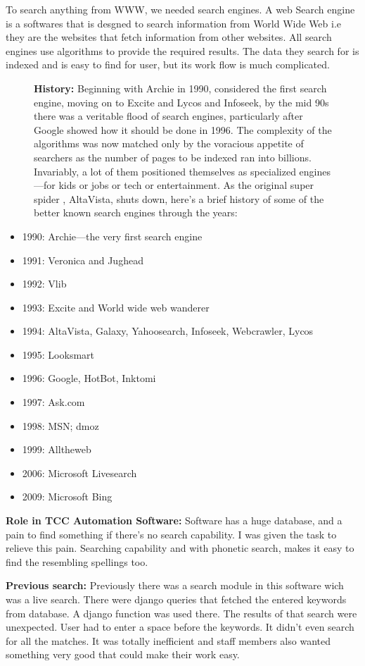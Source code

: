 To search anything from WWW, we
needed search engines. A web Search engine is a softwares  that is desgned 
to search information from World Wide Web i.e they are the websites that 
fetch information from other websites. All search engines use algorithms to 
provide the required results. The data they search for is indexed and is 
easy to find for user, but its work flow is much complicated.
\begin{figure}[h]
{\bf History:} 
Beginning with Archie in 1990, considered the first search engine, moving
on to Excite and Lycos and Infoseek, by the mid 90s there was a veritable 
flood of search engines, particularly after Google showed how it should be 
done in 1996. The complexity of the algorithms was now matched only by the
 voracious appetite of searchers as the number of pages to be indexed ran 
into billions. Invariably, a lot of them positioned themselves as specialized
engines—for kids or jobs or tech or entertainment. As the original super spider
, AltaVista, shuts down, here’s a brief history of some of the better known
search engines through the years:
\end{figure}
\begin{itemize}
\item 1990: Archie—the very first search engine
\item 1991: Veronica and Jughead
\item 1992: Vlib
\item 1993: Excite and World wide web wanderer
\item 1994: AltaVista, Galaxy, Yahoosearch, Infoseek, Webcrawler, Lycos
\item 1995: Looksmart
\item 1996: Google, HotBot, Inktomi
\item 1997: Ask.com
\item 1998: MSN; dmoz
\item 1999: Alltheweb
\item 2006: Microsoft Livesearch
\item 2009: Microsoft Bing
\end{itemize}


{\bf Role in TCC Automation Software:}
Software has a huge database, and a pain to find something if there's no search 
capability. I was given the task to relieve this pain. Searching capability and with
phonetic search, makes it easy to find the resembling spellings too.

{\bf Previous search:}
Previously there was a search module in this software 
wich was a live search. There were django queries that fetched the entered
keywords from database. A django function was used there. The results of that search were 
unexpected. User had to enter a space before the keywords. It didn't even search for all 
the matches. It was totally inefficient and staff members also wanted something very good that
could make their work easy.

